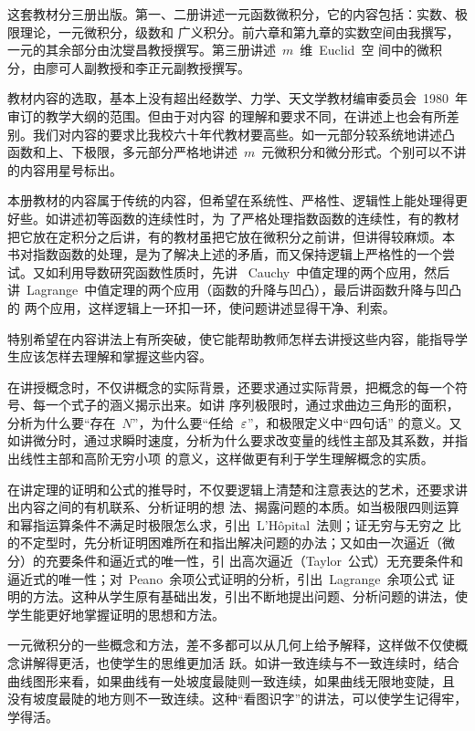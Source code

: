 
\begin{preface}
这套教材分三册出版。第一、二册讲述一元函数微积分，它的内容包括：实数、极限理论，一元微积分，级数和
广义积分。前六章和第九章的实数空间由我撰写，一元的其余部分由沈燮昌教授撰写。第三册讲述~$m$~维~Euclid~空
间中的微积分，由廖可人副教授和李正元副教授撰写。

教材内容的选取，基本上没有超出经数学、力学、天文学教材编审委员会~1980~年审订的教学大纲的范围。但由于对内容
的理解和要求不同，在讲述上也会有所差别。我们对内容的要求比我校六十年代教材要高些。如一元部分较系统地讲述凸
函数和上、下极限，多元部分严格地讲述~$m$~元微积分和微分形式。个别可以不讲的内容用星号标出。

本册教材的内容属于传统的内容，但希望在系统性、严格性、逻辑性上能处理得更好些。如讲述初等函数的连续性时，为
了严格处理指数函数的连续性，有的教材把它放在定积分之后讲，有的教材虽把它放在微积分之前讲，但讲得较麻烦。本
书对指数函数的处理，是为了解决上述的矛盾，而又保持逻辑上严格性的一个尝试。又如利用导数研究函数性质时，先讲
~Cauchy~中值定理的两个应用，然后讲~Lagrange~中值定理的两个应用（函数的升降与凹凸），最后讲函数升降与凹凸的
两个应用，这样逻辑上一环扣一环，使问题讲述显得干净、利索。

特别希望在内容讲法上有所突破，使它能帮助教师怎样去讲授这些内容，能指导学生应该怎样去理解和掌握这些内容。

在讲授概念时，不仅讲概念的实际背景，还要求通过实际背景，把概念的每一个符号、每一个式子的涵义揭示出来。如讲
序列极限时，通过求曲边三角形的面积，分析为什么要“存在~$N$”，为什么要“任给~$\varepsilon$”，和极限定义中“四句话”%
的意义。又如讲微分时，通过求瞬时速度，分析为什么要求改变量的线性主部及其系数，并指出线性主部和高阶无穷小项
的意义，这样做更有利于学生理解概念的实质。

在讲定理的证明和公式的推导时，不仅要逻辑上清楚和注意表达的艺术，还要求讲出内容之间的有机联系、分析证明的想
法、揭露问题的本质。如当极限四则运算和幂指运算条件不满足时极限怎么求，引出~L'H\^opital~法则；证无穷与无穷之
比的不定型时，先分析证明困难所在和指出解决问题的办法；又如由一次逼近（微分）的充要条件和逼近式的唯一性，引
出高次逼近（Taylor~公式）无充要条件和逼近式的唯一性；对~Peano~余项公式证明的分析，引出~Lagrange~余项公式
证明的方法。这种从学生原有基础出发，引出不断地提出问题、分析问题的讲法，使学生能更好地掌握证明的思想和方法。

一元微积分的一些概念和方法，差不多都可以从几何上给予解释，这样做不仅使概念讲解得更活，也使学生的思维更加活
跃。如讲一致连续与不一致连续时，结合曲线图形来看，如果曲线有一处坡度最陡则一致连续，如果曲线无限地变陡，且
没有坡度最陡的地方则不一致连续。这种“看图识字”的讲法，可以使学生记得牢，学得活。


\end{preface}
